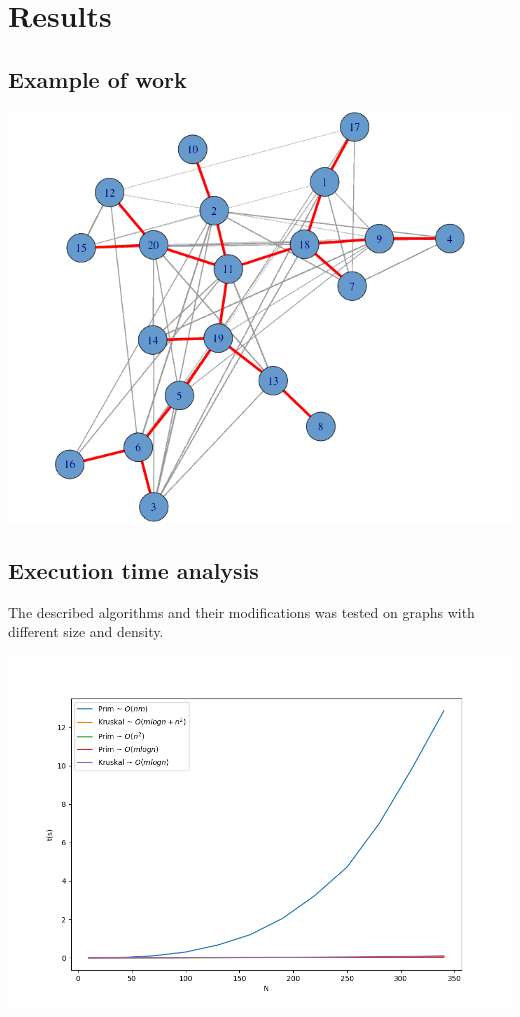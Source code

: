\section*{Results}

\subsection*{Example of work}

\begin{center}
    \includegraphics[width=0.6\linewidth]{../results/mst.png}
    \label{fig_rho_1_all}
\end{center}


\subsection*{Execution time analysis}
The described algorithms and their modifications was tested on graphs with different size and density.

\begin{center}
    \includegraphics[width=0.75\linewidth]{../results/rho_1_all.png}
    \label{fig_rho_1_all}
\end{center}

